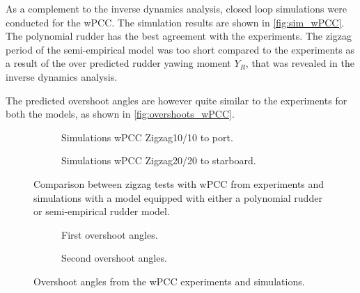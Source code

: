 As a complement to the inverse dynamics analysis, closed loop simulations were conducted for the wPCC. The simulation results are shown in \autoref{fig:sim_wPCC}. The polynomial rudder has the best agreement with the experiments. The zigzag period of the semi-empirical model was too short compared to the experiments as a result of the over predicted rudder yawing moment $Y_R$, that was revealed in the inverse dynamics analysis. 

The predicted overshoot angles are however quite similar to the experiments for both the models, as shown in \autoref{fig:overshoots_wPCC}.
\begin{figure}[h]
     \centering
     \begin{subfigure}[b]{\textwidth}
         \centering
         
        \caption{Simulations wPCC Zigzag10/10 to port.}
        \label{fig:sim_wPCC_10}
     \end{subfigure}
     \vfill
     \begin{subfigure}[b]{\textwidth}
        \centering
        
        \caption{Simulations wPCC Zigzag20/20 to starboard.}
        \label{fig:sim_wPCC_20}
     \end{subfigure}
        \caption{Comparison between zigzag tests with wPCC from experiments and simulations with a model equipped with either a polynomial rudder or semi-empirical rudder model.}
        \label{fig:sim_wPCC}
\end{figure}
\begin{figure}[h]
     \centering
     \begin{subfigure}[b]{\textwidth}
         \centering
         
        \caption{First overshoot angles.}
        \label{fig:overhoots1_wPCC}
     \end{subfigure}
     \vfill
     \begin{subfigure}[b]{\textwidth}
         \centering
         
        \caption{Second overshoot angles.}
        \label{fig:overhoots2_wPCC}
     \end{subfigure}
     
        \caption{Overshoot angles from the wPCC experiments and simulations.}
        \label{fig:overshoots_wPCC}
\end{figure}